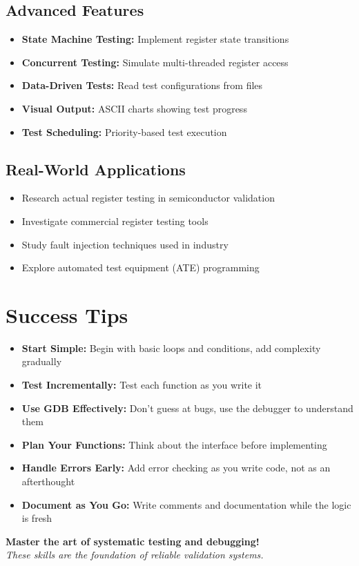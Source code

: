 \documentclass[11pt,a4paper]{article}
\begin{document}
\subsection{Advanced Features}
\begin{itemize}
    \item \textbf{State Machine Testing:} Implement register state transitions
    \item \textbf{Concurrent Testing:} Simulate multi-threaded register access
    \item \textbf{Data-Driven Tests:} Read test configurations from files
    \item \textbf{Visual Output:} ASCII charts showing test progress
    \item \textbf{Test Scheduling:} Priority-based test execution
\end{itemize}

\subsection{Real-World Applications}
\begin{itemize}
    \item Research actual register testing in semiconductor validation
    \item Investigate commercial register testing tools
    \item Study fault injection techniques used in industry
    \item Explore automated test equipment (ATE) programming
\end{itemize}

\section{Success Tips}

\begin{itemize}
    \item \textbf{Start Simple:} Begin with basic loops and conditions, add complexity gradually
    \item \textbf{Test Incrementally:} Test each function as you write it
    \item \textbf{Use GDB Effectively:} Don't guess at bugs, use the debugger to understand them
    \item \textbf{Plan Your Functions:} Think about the interface before implementing
    \item \textbf{Handle Errors Early:} Add error checking as you write code, not as an afterthought
    \item \textbf{Document as You Go:} Write comments and documentation while the logic is fresh
\end{itemize}

\vspace{1cm}

\begin{center}
\textbf{Master the art of systematic testing and debugging!}\\
\textit{These skills are the foundation of reliable validation systems.}
\end{center}
\end{document}
